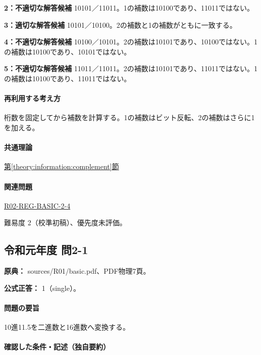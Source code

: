 \noindent\textbf{2：不適切な解答候補} 10101／11011。1の補数は10100であり、11011ではない。\par

\noindent\textbf{3：適切な解答候補} 10101／10100。2の補数と1の補数がともに一致する。\par

\noindent\textbf{4：不適切な解答候補} 10100／10101。2の補数は10101であり、10100ではない。1の補数は10100であり、10101ではない。\par

\noindent\textbf{5：不適切な解答候補} 11011／11011。2の補数は10101であり、11011ではない。1の補数は10100であり、11011ではない。\par

\paragraph{再利用する考え方} 桁数を固定してから補数を計算する。1の補数はビット反転、2の補数はさらに1を加える。

\paragraph{共通理論} \hyperref[theory:information:complement]{第\ref*{theory:information:complement}節}

\paragraph{関連問題} \hyperref[q:r02-reg-basic-2-4]{R02-REG-BASIC-2-4}

\par 難易度 2（校準初稿）、優先度未評価。

\subsection{令和元年度 問2-1}
\label{q:r01-reg-basic-2-1}

\noindent\textbf{原典：} sources/R01/basic.pdf、PDF物理7頁。

\textbf{公式正答：} 1（single）。

\paragraph{問題の要旨} 10進11.5を二進数と16進数へ変換する。

\paragraph{確認した条件・記述（独自要約）}\mbox{}\par

